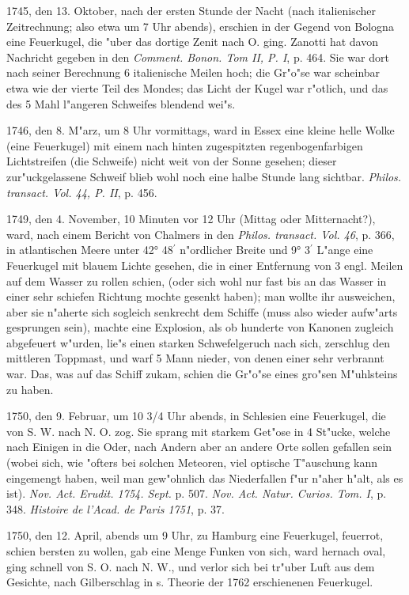 \documentclass[a4paper, 11pt, oneside, polutonikogreek, german]{article}
\begin{document}
1745, den 13. Oktober, nach der ersten Stunde der Nacht (nach italienischer Zeitrechnung; also etwa um 7 Uhr abends), erschien in der Gegend von Bologna eine Feuerkugel, die "uber das dortige Zenit nach O. ging. Zanotti hat davon Nachricht gegeben in den \emph{Comment. Bonon. Tom II, P. I}, p. 464. Sie war dort nach seiner Berechnung 6 italienische Meilen hoch; die Gr"o"se war scheinbar etwa wie der vierte Teil des Mondes; das Licht der Kugel war r"otlich, und das des 5 Mahl l"angeren Schweifes blendend wei"s.

1746, den 8. M"arz, um 8 Uhr vormittags, ward in Essex eine kleine helle Wolke (eine Feuerkugel) mit einem nach hinten zugespitzten regenbogenfarbigen Lichtstreifen (die Schweife) nicht weit von der Sonne gesehen; dieser zur"uckgelassene Schweif blieb wohl noch eine halbe Stunde lang sichtbar. \emph{Philos. transact. Vol. 44, P. II}, p. 456.

1749, den 4. November, 10 Minuten vor 12 Uhr (Mittag oder Mitternacht?), ward, nach einem Bericht von Chalmers in den \emph{Philos. transact. Vol. 46}, p. 366, in atlantischen Meere unter 42° 48$^{\prime}$ n"ordlicher Breite und 9° 3$^{\prime}$ L"ange eine Feuerkugel mit blauem Lichte gesehen, die in einer Entfernung von 3 engl. Meilen auf dem Wasser zu rollen schien, (oder sich wohl nur fast bis an das Wasser in einer sehr schiefen Richtung mochte gesenkt haben); man wollte ihr ausweichen, aber sie n"aherte sich sogleich senkrecht dem Schiffe (muss also wieder aufw"arts gesprungen sein), machte eine Explosion, als ob hunderte von Kanonen zugleich abgefeuert w"urden, lie"s einen starken Schwefelgeruch nach sich, zerschlug den mittleren Toppmast, und warf 5 Mann nieder, von denen einer sehr verbrannt war. Das, was auf das Schiff zukam, schien die Gr"o"se eines gro"sen M"uhlsteins zu haben.

1750, den 9. Februar, um 10 3/4 Uhr abends, in Schlesien eine Feuerkugel, die von S. W. nach N. O. zog. Sie sprang mit starkem Get"ose in 4 St"ucke, welche nach Einigen in die Oder, nach Andern aber an andere Orte sollen gefallen sein (wobei sich, wie "ofters bei solchen Meteoren, viel optische T"auschung kann eingemengt haben, weil man gew"ohnlich das Niederfallen f"ur n"aher h"alt, als es ist). \emph{Nov. Act. Erudit. 1754. Sept.} p. 507. \emph{Nov. Act. Natur. Curios. Tom. I}, p. 348. \emph{Histoire de l'Acad. de Paris 1751}, p. 37.

1750, den 12. April, abends um 9 Uhr, zu Hamburg eine Feuerkugel, feuerrot, schien bersten zu wollen, gab eine Menge Funken von sich, ward hernach oval, ging schnell von S. O. nach N. W., und verlor sich bei tr"uber Luft aus dem Gesichte, nach Gilberschlag in s. Theorie der 1762 erschienenen Feuerkugel.
\end{document}
